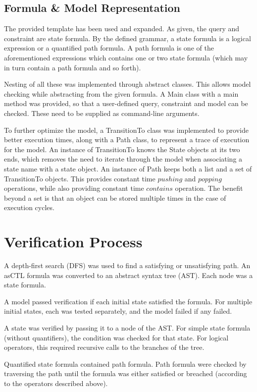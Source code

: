 \documentclass[a4paper,11pt]{article}
\begin{document}
	\subsection{Formula \& Model Representation}
	The provided template has been used and expanded. As given, the query and constraint are state formula. By the defined grammar, a state formula is a logical expression or a quantified path formula. A path formula is one of the aforementioned expressions which contains one or two state formula (which may in turn contain a path formula and so forth).

	Nesting of all these was implemented through abstract classes. This allows model checking while abstracting from the given formula. A Main class with a main method was provided, so that a user-defined query, constraint and model can be checked. These need to be supplied as command-line arguments.
	
	To further optimize the model, a TransitionTo class was implemented to provide better execution times, along with a Path class, to represent a trace of execution for the model. An instance of TransitionTo knows the State objects at its two ends, which removes the need to iterate through the model when associating a state name with a state object. An instance of Path keeps both a list and a set of TransitionTo objects. This provides constant time $pushing$ and $popping$ operations, while also providing constant time $contains$ operation. The benefit beyond a set is that an object can be stored multiple times in the case of execution cycles.
	
	\section{Verification Process}
	A depth-first search (DFS) was used to find a satisfying or unsatisfying path. An asCTL formula was converted to an abstract syntax tree (AST). Each node was a state formula. 
	
	A model passed verification if each initial state satisfied the formula. For multiple initial states, each was tested separately, and the model failed if any failed.
	
	A state was verified by passing it to a node of the AST. For simple state formula (without quantifiers), the condition was checked for that state. For logical operators, this required recursive calls to the branches of the tree.
	
	Quantified state formula contained path formula. Path formula were checked by traversing the path until the formula was either satisfied or breached (according to the operators described above).
	
\end{document}
